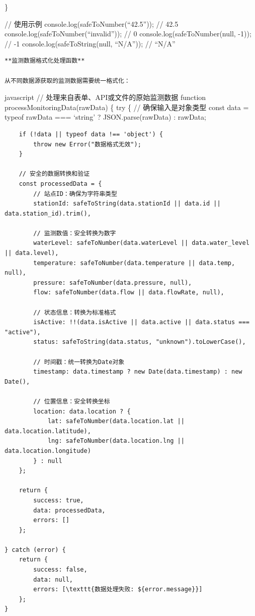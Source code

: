 \}

// 使用示例 console.log(safeToNumber(``42.5'')); // 42.5 console.log(safeToNumber(``invalid'')); // 0 console.log(safeToNumber(null, -1)); // -1 console.log(safeToString(null, ``N/A'')); // ``N/A''

\begin{lstlisting}
**监测数据格式化处理函数**

从不同数据源获取的监测数据需要统一格式化：
\end{lstlisting}

javascript // 处理来自表单、API或文件的原始监测数据 function processMonitoringData(rawData) \{ try \{ // 确保输入是对象类型 const data = typeof rawData === `string' ? JSON.parse(rawData) : rawData;

\begin{verbatim}
    if (!data || typeof data !== 'object') {
        throw new Error("数据格式无效");
    }
    
    // 安全的数据转换和验证
    const processedData = {
        // 站点ID：确保为字符串类型
        stationId: safeToString(data.stationId || data.id || data.station_id).trim(),
        
        // 监测数值：安全转换为数字
        waterLevel: safeToNumber(data.waterLevel || data.water_level || data.level),
        temperature: safeToNumber(data.temperature || data.temp, null),
        pressure: safeToNumber(data.pressure, null),
        flow: safeToNumber(data.flow || data.flowRate, null),
        
        // 状态信息：转换为标准格式
        isActive: !!(data.isActive || data.active || data.status === "active"),
        status: safeToString(data.status, "unknown").toLowerCase(),
        
        // 时间戳：统一转换为Date对象
        timestamp: data.timestamp ? new Date(data.timestamp) : new Date(),
        
        // 位置信息：安全转换坐标
        location: data.location ? {
            lat: safeToNumber(data.location.lat || data.location.latitude),
            lng: safeToNumber(data.location.lng || data.location.longitude)
        } : null
    };
    
    return {
        success: true,
        data: processedData,
        errors: []
    };
    
} catch (error) {
    return {
        success: false,
        data: null,
        errors: [\texttt{数据处理失败: ${error.message}}]
    };
}
\end{verbatim}

